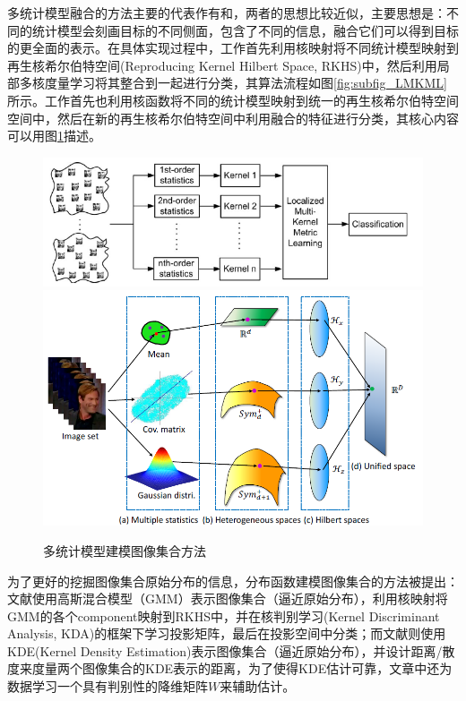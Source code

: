 多统计模型融合的方法主要的代表作有\cite{Statistics_LMKML}和\cite{Statistics_HERML}，两者的思想比较近似，主要思想是：不同的统计模型会刻画目标的不同侧面，包含了不同的信息，融合它们可以得到目标的更全面的表示。在具体实现过程中，工作\cite{Statistics_LMKML}首先利用核映射将不同统计模型映射到再生核希尔伯特空间(Reproducing Kernel Hilbert Space, RKHS)中，然后利用局部多核度量学习将其整合到一起进行分类，其算法流程如图\ref{fig:subfig_LMKML}所示。工作\cite{Statistics_HERML}首先也利用核函数将不同的统计模型映射到统一的再生核希尔伯特空间空间中，然后在新的再生核希尔伯特空间中利用融合的特征进行分类，其核心内容可以用图\ref{fig:Multi_Stat}描述。
\begin{figure}[h]
  \centering
      {\includegraphics[width=0.51\linewidth]{source/Statistics_LMKML.png}}
  \hspace{1em}%
      {\includegraphics[width=0.45\linewidth]{source/Statistics_HERML.png}}
  \caption{多统计模型建模图像集合方法}
  \label{fig:Multi_Stat}
\end{figure}

为了更好的挖掘图像集合原始分布的信息，分布函数建模图像集合的方法被提出：文献\cite{Statistics_DARG}使用高斯混合模型（GMM）表示图像集合（逼近原始分布），利用核映射将GMM的各个component映射到RKHS中，并在核判别学习(Kernel Discriminant Analysis, KDA)\cite{Kernel_KDA}的框架下学习投影矩阵，最后在投影空间中分类；而文献\cite{Statistics_BeyondGauss}则使用KDE(Kernel Density Estimation)表示图像集合（逼近原始分布），并设计距离/散度来度量两个图像集合的KDE表示的距离，为了使得KDE估计可靠，文章中还为数据学习一个具有判别性的降维矩阵$W$来辅助估计。

